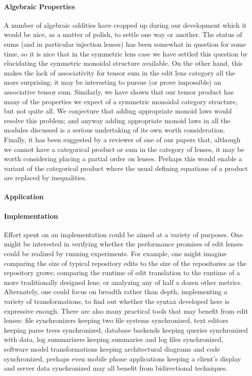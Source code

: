 \paragraph*{Algebraic Properties}
A number of algebraic oddities have cropped up during our development which
it would be nice, as a matter of polish, to settle one way or another. The
status of sums (and in particular injection lenses) has been somewhat in
question for some time, so it is nice that in the symmetric lens case we
have settled this question by elucidating the symmetric monoidal structure
available. On the other hand, this makes the lack of associativity for
tensor sum in the edit lens category all the more surprising; it may be
interesting to pursue (or prove impossible) an associative tensor sum.
Similarly, we have shown that our tensor product has many of the properties
we expect of a symmetric monoidal category structure, but not quite all. We
conjecture that adding appropriate monoid laws would resolve this problem;
and anyway adding appropriate monoid laws in all the modules discussed is a
serious undertaking of its own worth consideration. Finally, it has been
suggested by a reviewer of one of our papers that, although we cannot have a
categorical product or sum in the category of lenses, it may be worth
considering placing a partial order on lenses. Perhaps this would enable a
variant of the categorical product where the usual defining equations of a
product are replaced by inequalities.

\ifimpl
\paragraph*{Application}
\else
\paragraph*{Implementation}
\fi
Effort spent on an implementation could be aimed at a variety of purposes.
One might be interested in verifying whether the performance promises of
edit lenses could be realized by running experiments. For example, one might
imagine comparing the size of typical repository edits to the size of the
repositories as the repository grows; comparing the runtime of edit
translation to the runtime of a more traditionally designed lens; or
analyzing any of half a dozen other metrics. Alternately, one could focus on
breadth rather than depth, implementing a variety of transformations, to
find out whether the syntax developed here is expressive enough. There are
also many practical tools that may benefit from edit lenses: file
synchronizers keeping two file systems synchronized, text editors keeping
parse trees synchronized, database backends keeping queries synchronized
with data, log summarizers keeping summaries and log files synchronized,
software model transformations keeping architectural diagrams and code
synchronized, perhaps even mobile phone applications keeping a client's
display and server data synchronized may all benefit from bidirectional
techniques.


